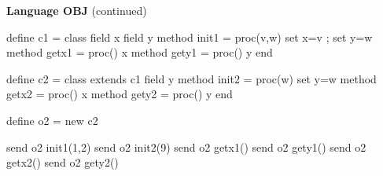 \begin{minipage}[t]{\sw}
\slidenumber
\LARGE
{\bf Language OBJ} (continued)
\Large
\begin{qv}
define c1 = class
  field x field y
  method init1 = proc(v,w) {set x=v ; set y=w}
  method getx1 = proc() x
  method gety1 = proc() y
end

define c2 = class extends c1
  field y
  method init2 = proc(w) set y=w
  method getx2 = proc() x
  method gety2 = proc() y
end

define o2 = new c2

send o2 init1(1,2) %
send o2 init2(9)   %
send o2 getx1()    %
send o2 gety1()    %
send o2 getx2()    %
send o2 gety2()    %
\end{qv}
\end{minipage}
